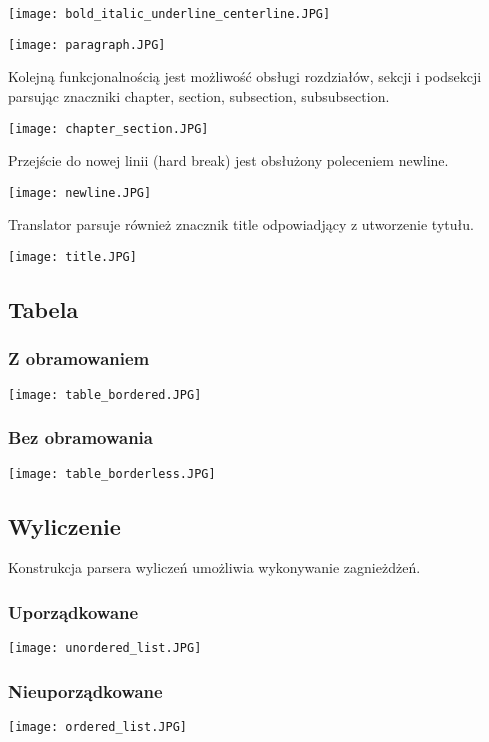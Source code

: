 \texttt{[image: bold\_italic\_underline\_centerline.JPG]}

\texttt{[image: paragraph.JPG]}


Kolejną funkcjonalnością jest możliwość obsługi rozdziałów, sekcji i podsekcji parsując znaczniki chapter, section, subsection, 
subsubsection.


\texttt{[image: chapter\_section.JPG]}


Przejście do nowej linii (hard break) jest obsłużony poleceniem newline.

\texttt{[image: newline.JPG]}


Translator parsuje również znacznik title odpowiadjący z utworzenie tytułu.

\texttt{[image: title.JPG]}

\subsection{Tabela}

\subsubsection{Z obramowaniem}

\texttt{[image: table\_bordered.JPG]}

\subsubsection{Bez obramowania}

\texttt{[image: table\_borderless.JPG]}


\subsection{Wyliczenie}

Konstrukcja parsera wyliczeń umożliwia wykonywanie zagnieżdżeń.

\subsubsection{Uporządkowane}

\texttt{[image: unordered\_list.JPG]}

\subsubsection{Nieuporządkowane}

\texttt{[image: ordered\_list.JPG]}

